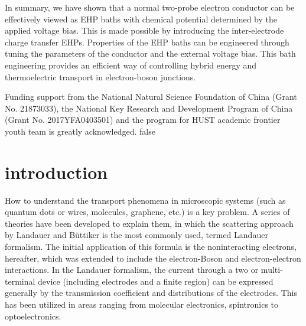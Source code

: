 \documentclass[aps
,twocolumn
,floatfix,footinbib,prl
]{revtex4-1}
\begin{document}
In summary, we have shown that a normal two-probe electron conductor can be effectively viewed as EHP baths with chemical potential determined by the applied voltage bias. This is made possible by introducing the inter-electrode charge transfer EHPs. Properties of the EHP baths can be engineered through tuning the parameters of the conductor and the external voltage bias. This bath engineering provides an efficient way of controlling hybrid energy and thermoelectric transport in electron-boson junctions. 

Funding support from the National Natural Science Foundation of China
(Grant No. 21873033), the National Key Research and Development Program of China
(Grant No. 2017YFA0403501) and the program for HUST academic frontier youth team is greatly acknowledged.
\if false
\clearpage
\appendix
\section{introduction}
How to understand the transport phenomena in microscopic systems (such as quantum dots or wires, molecules, graphene, etc.) is a key problem. A series of
theories have been developed to explain them, in which the scattering approach by Landauer\cite{landauer1957spatial} and B\"{u}ttiker\cite{buttiker1986four} is the most commonly used, termed Landauer formalism. The initial application of this formula is the noninteracting electrons, hereafter, which was extended to include the electron-Boson and electron-electron interactions\cite{meir1992landauer,jauho1994time,lu2007coupled}.
In the Landauer formalism, the current through a two or multi- terminal device (including electrodes and a finite region) can be expressed generally by the transmission coefficient and distributions of the electrodes. This has been utilized in areas ranging from molecular electronics, spintronics to optoelectronics\cite{galperin2007molecular,haug2008quantum,galperin2012molecular}.
\end{document}
